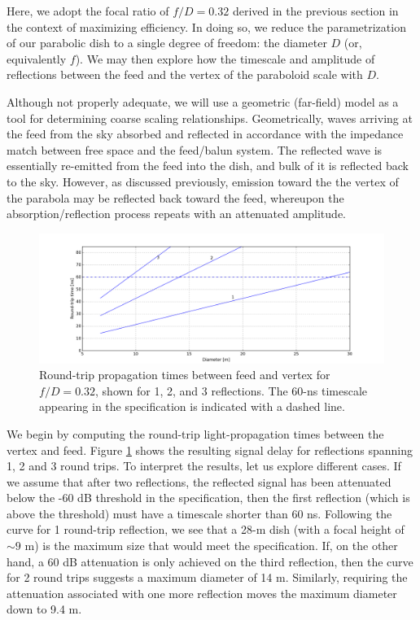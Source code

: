 \documentclass[11pt]{article}
\begin{document}
Here, we adopt the focal ratio of $f/D=0.32$ derived in the previous section in
the context of maximizing efficiency.  In doing so, we reduce the parametrization of our parabolic
dish to a single degree of freedom: the diameter $D$ (or, equivalently $f$).  We may then explore how the timescale and amplitude of reflections between the feed and the vertex of the paraboloid scale with $D$.

Although not properly adequate, we will use a geometric (far-field) model as a tool for determining coarse scaling relationships.  Geometrically, waves arriving at the feed from the sky absorbed and reflected in accordance with the impedance match between free space and the feed/balun system.  The reflected wave is essentially re-emitted from the feed into the dish, and bulk of it is reflected back to the
sky.  However, as discussed previously, emission toward the the vertex of the parabola may be reflected
back toward the feed, whereupon the absorption/reflection process repeats with an attenuated amplitude.

\begin{figure}[h]
\centering
\includegraphics[width=1.0\textwidth]{roundtrip.png}
\caption{Round-trip propagation times between feed and vertex for $f/D=0.32$, 
shown for 1, 2, and 3 reflections.  The 60-ns timescale appearing in the specification
is indicated with a dashed line.}
\label{fig:roundtrip}
\end{figure}

We begin by computing the round-trip light-propagation times between the vertex and feed.  Figure
\ref{fig:roundtrip} shows the resulting signal delay for reflections spanning 1, 2 and
3 round trips.  To interpret the results, let us explore different cases.
If we assume that after two reflections, the reflected signal has been attenuated
below the -60 dB threshold in the specification, then the first reflection (which is above the
threshold) must have a timescale shorter than 60 ns.  Following the curve for 1 round-trip
reflection, we see that a 28-m dish (with a focal height of $\sim9$ m) is the maximum size
that would meet the specification.  If, on the other hand, a 60 dB attenuation is only achieved on the
third reflection, then the curve for 2 round trips suggests a maximum diameter of 14 m.  Similarly,
requiring the attenuation associated with one more reflection moves the maximum diameter down
to 9.4 m.
\end{document}
